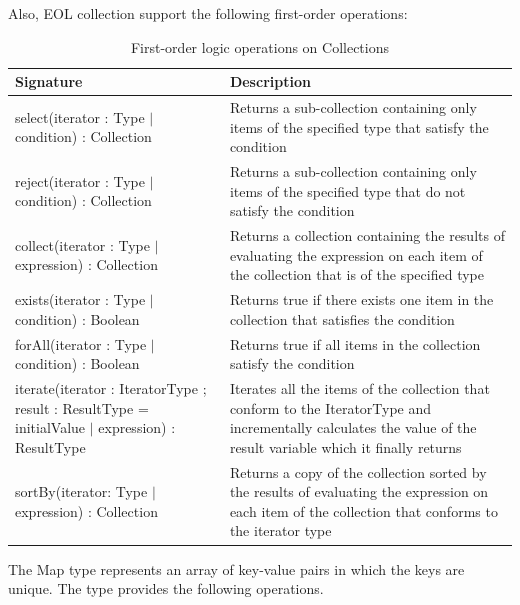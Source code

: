 Also, EOL collection support the following first-order operations:

\begin{longtable} {|p{5.5cm}|p{6.5cm}|}
			
			\caption{First-order logic operations on Collections}
			\label{tab:FirstOrderOperations}\\
			
			\hline
							
			\textbf{Signature} & \textbf{Description} \\\hline

			select(iterator : Type $|$ condition) : Collection & Returns a sub-collection containing only items of the specified type that satisfy the condition \\\hline 
			
			reject(iterator : Type $|$ condition) : Collection & Returns a sub-collection containing only items of the specified type that do not satisfy the condition \\\hline
			
			collect(iterator : Type $|$ expression) : Collection &  Returns a collection containing the results of evaluating the expression on each item of the collection that is of the specified type \\\hline
			
			exists(iterator : Type $|$ condition) : Boolean & Returns true if there exists one item in the collection that satisfies the condition \\\hline
			
			forAll(iterator : Type $|$ condition) : Boolean & Returns true if all items in the collection satisfy the condition \\\hline
			
			iterate(iterator : IteratorType ; result : ResultType = initialValue $|$ expression) : ResultType & Iterates all the items of the collection that conform to the IteratorType and incrementally calculates the value of the result variable which it finally returns \\\hline
			
			sortBy(iterator: Type $|$ expression) : Collection & Returns a copy of the collection sorted by the results of evaluating the expression on each item of the collection that conforms to the iterator type \\\hline

\end{longtable}

The Map type represents an array of key-value pairs in which the keys are unique. The type provides the following operations.

